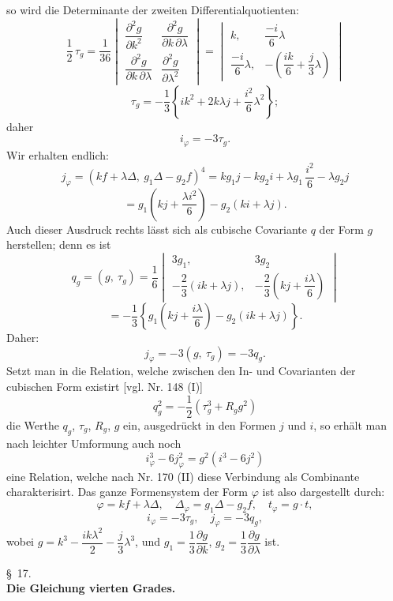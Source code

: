 so wird die Determinante der zweiten Differentialquotienten:
\[
\frac{1}{2}\,\tau_g = \frac{1}{36}
\begin{vmatrix}
\dfrac{\partial^2 g}{\partial k^2} & \dfrac{\partial^2 g}{\partial k\,\partial \lambda} \\
\dfrac{\partial^2 g}{\partial k\,\partial \lambda} & \dfrac{\partial^2 g}{\partial \lambda^2}
\end{vmatrix}
=
\begin{vmatrix}
k, & \dfrac{-i}{6}\lambda \\
\dfrac{-i}{6}\lambda, & -\left(\dfrac{ik}{6}+\dfrac{j}{3}\lambda\right)
\end{vmatrix}
\]
\[
\tau_g = -\frac{1}{3}\left\{ i k^2 + 2k\lambda j + \frac{i^2}{6}\lambda^2 \right\};
\]
daher
\[
i_\varphi = -3\tau_g .
\]
Wir erhalten endlich:
\[
j_\varphi = (kf+\lambda\varDelta,\ g_1\varDelta - g_2 f)^4 = k g_1 j - k g_2 i + \lambda g_1\,\frac{i^2}{6} - \lambda g_2 j
\]
\[
= g_1\left(kj + \frac{\lambda i^2}{6}\right) - g_2(ki+\lambda j).
\]
Auch dieser Ausdruck rechts lässt sich als cubische Covariante $q$ der
Form $g$ herstellen; denn es ist
\[
q_g = (g,\ \tau_g) = \frac{1}{6}
\begin{vmatrix}
3g_1, & 3g_2 \\
-\dfrac{2}{3}(ik+\lambda j), & -\dfrac{2}{3}\left(kj+\dfrac{i\lambda}{6}\right)
\end{vmatrix}
\]
\[
= -\frac{1}{3}\left\{ g_1\left(kj+\frac{i\lambda}{6}\right) - g_2(ik+\lambda j) \right\}.
\]
Daher:
\[
j_\varphi = -3(g,\ \tau_g) = -3 q_g .
\]
Setzt man in die Relation, welche zwischen den In- und Covarianten
 der cubischen Form existirt [vgl. Nr. 148 (I)]
\[
q_g^2 = -\frac{1}{2}(\tau_g^3 + R_g g^2)
\]
die Werthe $q_g$, $\tau_g$, $R_g$, $g$ ein, ausgedrückt in den Formen $j$ und $i$,
so erhält man nach leichter Umformung auch noch
\[
i_\varphi^3 - 6 j_\varphi^2 = g^2(i^3 - 6j^2)
\]
eine Relation, welche nach Nr. 170 (II) diese Verbindung als Combinante
 charakterisirt. Das ganze Formensystem der Form $\varphi$ ist also
dargestellt durch:
\[
\varphi = kf+\lambda\varDelta, \quad \varDelta_\varphi = g_1\varDelta - g_2 f, \quad t_\varphi = g\cdot t,
\]
\[
i_\varphi = -3\tau_g, \quad j_\varphi = -3q_g,
\]
wobei $g = k^3 - \dfrac{ik\lambda^2}{2} - \dfrac{j}{3}\lambda^3$, und $g_1 = \dfrac{1}{3}\dfrac{\partial g}{\partial k}$, $g_2 = \dfrac{1}{3}\dfrac{\partial g}{\partial \lambda}$ ist.


\begin{center}
\S~17.\\[2pt]
\textbf{Die Gleichung vierten Grades.}
\end{center}

